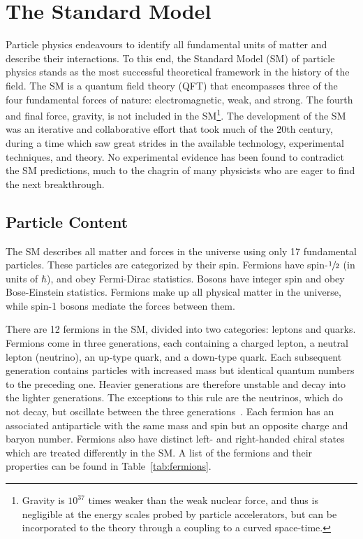 \chapter{The Standard Model}
\label{chap:sm}

Particle physics endeavours to identify all fundamental units of matter and describe their interactions.
To this end, the Standard Model (SM) of particle physics stands as the most successful theoretical framework in the history of the field.
The SM is a quantum field theory (QFT) that encompasses three of the four fundamental forces of nature: electromagnetic, weak, and strong.
The fourth and final force, gravity, is not included in the SM\footnote{Gravity is $10^{37}$ times weaker than the weak nuclear force, and thus is negligible at the energy scales probed by particle accelerators, but can be incorporated to the theory through a coupling to a curved space-time.}.
The development of the SM was an iterative and collaborative effort that took much of the 20th century, during a time which saw great strides in the available technology, experimental techniques, and theory.
No experimental evidence has been found to contradict the SM predictions, much to the chagrin of many physicists who are eager to find the next breakthrough.

\section{Particle Content}

The SM describes all matter and forces in the universe using only 17 fundamental particles.
These particles are categorized by their spin.
Fermions have spin-$\sfrac{1}{2}$ (in units of $\hbar$), and obey Fermi-Dirac statistics.
Bosons have integer spin and obey Bose-Einstein statistics.
Fermions make up all physical matter in the universe, while spin-1 bosons mediate the forces between them.

There are 12 fermions in the SM, divided into two categories: leptons and quarks.
Fermions come in three generations, each containing a charged lepton, a neutral lepton (neutrino), an up-type quark, and a down-type quark.
Each subsequent generation contains particles with increased mass but identical quantum numbers to the preceding one.
Heavier generations are therefore unstable and decay into the lighter generations.
The exceptions to this rule are the neutrinos, which do not decay, but oscillate between the three generations~\cite{NeutrinoOsc}.
Each fermion has an associated antiparticle with the same mass and spin but an opposite charge and baryon number.
Fermions also have distinct left- and right-handed chiral states which are treated differently in the SM\@.
A list of the fermions and their properties can be found in Table~\ref{tab:fermions}.

